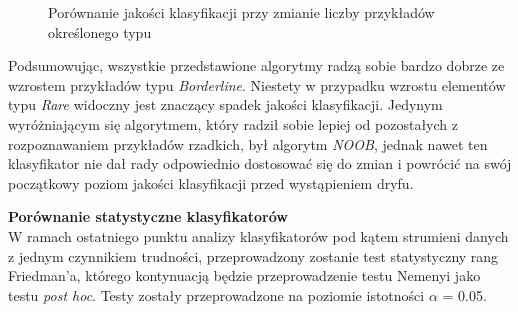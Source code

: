 \begin{figure}[h]
    \centering
    \qquad
    \caption{Porównanie jakości klasyfikacji przy zmianie liczby przykładów określonego typu}\label{Figure:BorderlineRare}
\end{figure}

\noindent Podsumowując, wszystkie przedstawione algorytmy radzą sobie bardzo dobrze ze wzrostem przykładów typu \textit{Borderline}. Niestety w przypadku wzrostu elementów typu \textit{Rare} widoczny jest znaczący spadek jakości klasyfikacji. Jedynym wyróżniającym się algorytmem, który radził sobie lepiej od pozostałych z rozpoznawaniem przykładów rzadkich, był algorytm \textit{NOOB}, jednak nawet ten klasyfikator nie dał rady odpowiednio dostosować się do zmian i powrócić na swój początkowy poziom jakości klasyfikacji przed wystąpieniem dryfu.

\noindent \textbf{Porównanie statystyczne klasyfikatorów}\\

\noindent W ramach ostatniego punktu analizy klasyfikatorów pod kątem strumieni danych z jednym czynnikiem trudności, przeprowadzony zostanie test statystyczny rang Friedman'a, którego kontynuacją będzie przeprowadzenie testu Nemenyi jako testu \textit{post hoc}. Testy zostały przeprowadzone na poziomie istotności $\alpha$ = 0.05.

